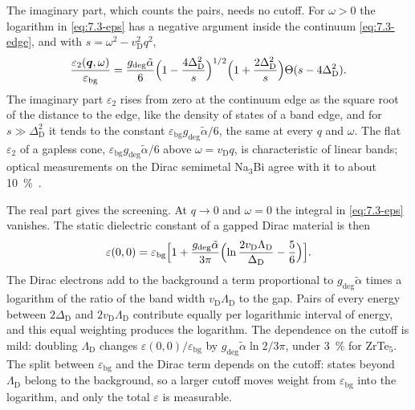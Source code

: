 The imaginary part, which counts the pairs, needs no cutoff. For $\omega > 0$ the logarithm in \cref{eq:7.3-eps} has a negative argument inside the continuum \cref{eq:7.3-edge}, and with $s = \omega^2 - v_{\mathrm{D}}^2q^2$,
\begin{equation}
  \frac{\varepsilon_2(\bm{q},\omega)}{\varepsilon_{\mathrm{bg}}} = \frac{g_{\mathrm{deg}}\tilde\alpha}{6}\Bigl(1 - \frac{4\Delta_{\mathrm{D}}^2}{s}\Bigr)^{1/2}\Bigl(1 + \frac{2\Delta_{\mathrm{D}}^2}{s}\Bigr)\Theta(s - 4\Delta_{\mathrm{D}}^2) .
  \label{eq:7.3-Im}
\end{equation}
The imaginary part $\varepsilon_2$ rises from zero at the continuum edge as the square root of the distance to the edge, like the density of states of a band edge, and for $s \gg \Delta_{\mathrm{D}}^2$ it tends to the constant $\varepsilon_{\mathrm{bg}}g_{\mathrm{deg}}\tilde\alpha/6$, the same at every $q$ and $\omega$. The flat $\varepsilon_2$ of a gapless cone, $\varepsilon_{\mathrm{bg}}g_{\mathrm{deg}}\tilde\alpha/6$ above $\omega = v_{\mathrm{D}}q$, is characteristic of linear bands; optical measurements on the Dirac semimetal Na$_3$Bi agree with it to about \SI{10}{\percent}~\cite{hochberg2018detection}.

The real part gives the screening. At $q \to 0$ and $\omega = 0$ the integral in \cref{eq:7.3-eps} vanishes. The static dielectric constant of a gapped Dirac material is then
\begin{equation}
  \varepsilon(0,0) = \varepsilon_{\mathrm{bg}}\Bigl[1 + \frac{g_{\mathrm{deg}}\tilde\alpha}{3\pi}\Bigl(\ln\frac{2v_{\mathrm{D}}\Lambda_{\mathrm{D}}}{\Delta_{\mathrm{D}}} - \frac56\Bigr)\Bigr] .
  \label{eq:7.3-static}
\end{equation}
The Dirac electrons add to the background a term proportional to $g_{\mathrm{deg}}\tilde\alpha$ times a logarithm of the ratio of the band width $v_{\mathrm{D}}\Lambda_{\mathrm{D}}$ to the gap. Pairs of every energy between $2\Delta_{\mathrm{D}}$ and $2v_{\mathrm{D}}\Lambda_{\mathrm{D}}$ contribute equally per logarithmic interval of energy, and this equal weighting produces the logarithm. The dependence on the cutoff is mild: doubling $\Lambda_{\mathrm{D}}$ changes $\varepsilon(0,0)/\varepsilon_{\mathrm{bg}}$ by $g_{\mathrm{deg}}\tilde\alpha\ln2/3\pi$, under \SI{3}{\percent} for ZrTe$_5$. The split between $\varepsilon_{\mathrm{bg}}$ and the Dirac term depends on the cutoff: states beyond $\Lambda_{\mathrm{D}}$ belong to the background, so a larger cutoff moves weight from $\varepsilon_{\mathrm{bg}}$ into the logarithm, and only the total $\varepsilon$ is measurable.

